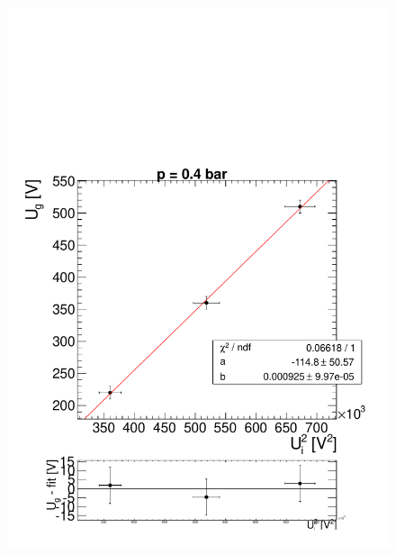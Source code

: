 \documentclass[a4paper,12pt]{article}
\begin{document}
\begin{figure}[htb]
		\includegraphics[height = 0.3\textheight]{linReg400bar.pdf}

\end{figure}
\end{document}
